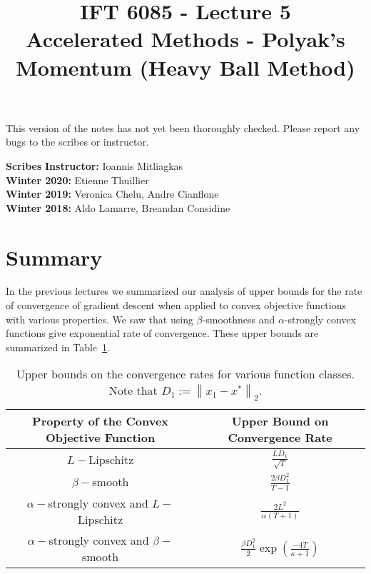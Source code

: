 \documentclass{article}
\title{IFT 6085 - Lecture 5 \\ 
Accelerated Methods - Polyak's Momentum (Heavy Ball Method) }
\date{}
\newcommand\norm[1]{\left\lVert#1\right\rVert}
\begin{document}
 

\maketitle

\vspace{-0.5in}
\begin{center}
This version of the notes has not yet been thoroughly checked.
Please report any bugs to the scribes or instructor.
\end{center}
\vspace{0.2in}

\textbf{Scribes}\hfill
\textbf{Instructor:}  Ioannis Mitliagkas\\
\textbf{Winter 2020:} Etienne Thuillier\\
\textbf{Winter 2019:} Veronica Chelu, Andre Cianflone\\
\textbf{Winter 2018:} Aldo Lamarre, Breandan Considine



\newcommand{\infgc}{\inf_{g \in \mathcal{C}}}
\newcommand{\supgc}{\sup_{g \in \mathcal{C}}}

\newcommand{\Prob}{\mathbb{P}}
\newcommand{\E}{\mathbb{E}}
\newcommand{\reals}{\mathbb{R}}


\section{Summary}

In the previous lectures we summarized our analysis of upper bounds for the rate of convergence of gradient descent when applied to convex objective functions with various properties. We saw that using $\beta$-smoothness and $\alpha$-strongly convex  functions give exponential rate of convergence.  These upper bounds are summarized in Table~\ref{tab:upper_bounds}.

\begin{table}[H]
\centering
    {
    \renewcommand{\arraystretch}{2.0}
    \begin{tabular}{cc}
    \toprule
		\textbf{Property of the Convex Objective Function} 
		& 
		\textbf{Upper Bound on Convergence Rate}
		\\
	\toprule
		$L-$Lipschitz & $ \frac{L D_1}{\sqrt{T}}$
	\\
		$\beta-$smooth & $ \frac{2 \beta D^2_1 }{T - 1}$
	\\
		$\alpha-$strongly convex and $L-$Lipschitz & $ \frac{2 L^2}{\alpha \left(T+1\right)}$
	\\
		$\alpha-$strongly convex and $\beta-$smooth & $ \frac{\beta D^2_1}{2} \exp({\frac{-4T}{\kappa + 1}})$
		\\
	\bottomrule
	\end{tabular}
	}
\caption{
    Upper bounds on the convergence rates for various function classes. Note that $D_1 := \norm{x_1 - x^*}_2$.
}
\label{tab:upper_bounds}
\end{table}
\end{document}
